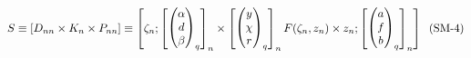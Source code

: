 \documentclass[preview]{standalone}
\begin{document}
\begin{align*}
\special{dvisvgm:raw <g id='unique000'>}S \equiv \left[ D_{nn}\times K_n\times P_{nn} \right] \equiv \left[ \zeta_n;\begin{bmatrix}\begin{pmatrix}\alpha\\d\\\beta\end{pmatrix}_q\end{bmatrix}_n \times \begin{bmatrix}\begin{pmatrix}y\\\chi\\r\end{pmatrix}_q\end{bmatrix}_n F(\zeta_n,z_n) \times z_n;\begin{bmatrix}\begin{pmatrix}a\\f\\b\end{pmatrix}_q\end{bmatrix}_n \right]\;\; (\text{SM-4})\special{dvisvgm:raw </g>}
\end{align*}
\end{document}
